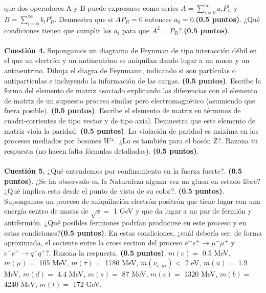 \documentclass[paper=a4, fontsize=11pt]{scrartcl} %
\numberwithin{equation}{section} %
\numberwithin{figure}{section} %
\numberwithin{table}{section} %
\begin{document}
que dos operadores A y B puede expresarse como series $A = \sum_{i=0}^{\infty} a_i P_L^i$ y $B = \sum_{i=0}^{\infty} b_i P_R^i$. Demuestra que si $A P_R = 0$ entonces $a_0 = 0. $\textbf{(0.5 puntos)}.
¿Qué condiciones tienen que cumplir los $a_i$ para que $A^2=P_R$?.\textbf{(0.5 puntos)}. 
\\
\\
\textbf{Cuestión 4.} Supongamos un diagrama de Feynman de tipo interacción débil en el que un electrón y un antineutrino se aniquilan dando lugar a un muon y un antineutrino. Dibuja el diagra de Feynmann, indicando si son partículas o antipartículas e incluyendo la información de las cargas. \textbf{(0.5 puntos)}. Escribe la forma del elemento de matriz asociado explicando las diferencias con el elemento de matriz de un supuesto proceso similar pero electromagnético (asumiendo que fuera posible). \textbf{(0.5 puntos)}. Escribe el elemento de matriz en términos de cuadri-corrientes de tipo vector y de tipo axial. Demuestra que este elemento de matriz viola la paridad. \textbf{(0.5 puntos)}. La violación de paridad es máxima en los procesos mediados por bosones $W^{\pm}$. ¿Lo es también para el bosón Z?. Razona tu respuesta (no hacen falta fórmulas detalladas). \textbf{(0.5 puntos)}.  
\\
\\
\textbf{Cuestión 5.} ¿Qué entendemos por confinamiento en la fuerza fuerte?. \textbf{(0.5 puntos)}. ¿Se ha observado en la Naturaleza alguna vez un gluon en estado libre?
¿Qué implica esto desde el punto de vista de su color?. \textbf{(0.5 puntos)}. Supongamos un proceso de aniquilación electrón-positrón que tiene lugar con una energía centro
de masas de $\sqrt{s} = $ 1 GeV y que da lugar a un par de fermión y antifermión. ¿Qué posibles fermiones podrían producirse en este proceso y en estas condiciones?\textbf{(0.5 puntos)}.
En estas condiciones, ¿cuál debería ser, de forma aproximada, el cociente entre la cross section del proceso $e^{-}e^{+}\rightarrow\mu^{-}\mu^{+}$ y $e^{-}e^{+}\rightarrow q^{-}q^{+}$?.
Razona la respuesta. \textbf{(0.5 puntos)}. $m(e)=$ 0.5 MeV, $m(\mu)=$ 105 MeV, $m(\tau)=$ 1780 MeV, $m(\nu_{e,\mu\tau})<$ 2 eV, $m(u) =$ 1.9 MeV, $m(d) = $ 4.4 MeV, $m(s) = $ 87 MeV, $m(c) = $ 1320 MeV, $m(b) = $ 4240 MeV, $m(t) = $ 172 GeV. 
\\
\\
\end{document}
